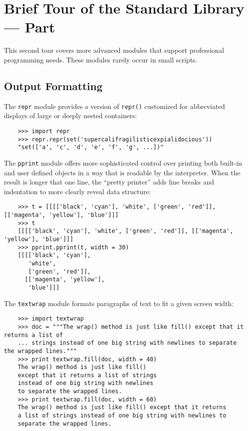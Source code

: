 \documentclass[UTF8]{article}
\newcommand{\RN}[1]{%
  \textup{\uppercase\expandafter{\romannumeral#1}}%
}
\begin{document}
\section{Brief Tour of the Standard Library --- Part \RN{2}}
This second tour covers more advanced modules that support professional programming needs. These
modules rarely occur in small scripts.

\subsection{Output Formatting}
The \texttt{repr} module provides a version of \texttt{repr()} customized for abbreviated displays
of large or deeply nested containers:
\begin{verbatim}
    >>> import repr
    >>> repr.repr(set('supercalifragilisticexpialidocious'))
    "set(['a', 'c', 'd', 'e', 'f', 'g', ...])"
\end{verbatim}

The \texttt{pprint} module offers more sophisticated control over printing both built-in and user
defined objects in a way that is readable by the interpreter. When the result is longer that one
line, the ``pretty printer'' adds line breaks and indentation to more clearly reveal data
structure:
\begin{verbatim}
    >>> t = [[[['black', 'cyan'], 'white', ['green', 'red']], [['magenta', 'yellow'], 'blue']]]
    >>> t
    [[[['black', 'cyan'], 'white', ['green', 'red']], [['magenta', 'yellow'], 'blue']]]
    >>> pprint.pprint(t, width = 30)
    [[[['black', 'cyan'],
       'white',
       ['green', 'red']],
      [['magenta', 'yellow'],
       'blue']]]
\end{verbatim}

The \texttt{textwrap} module formats paragraphs of text to fit a given screen width:
\begin{verbatim}
    >>> import textwrap
    >>> doc = """The wrap() method is just like fill() except that it returns a list of
    ... strings instead of one big string with newlines to separate the wrapped lines."""
    >>> print textwrap.fill(doc, width = 40)
    The wrap() method is just like fill()
    except that it returns a list of strings
    instead of one big string with newlines
    to separate the wrapped lines.
    >>> print textwrap.fill(doc, width = 60)
    The wrap() method is just like fill() except that it returns
    a list of strings instead of one big string with newlines to
    separate the wrapped lines.
\end{verbatim}
\end{document}
